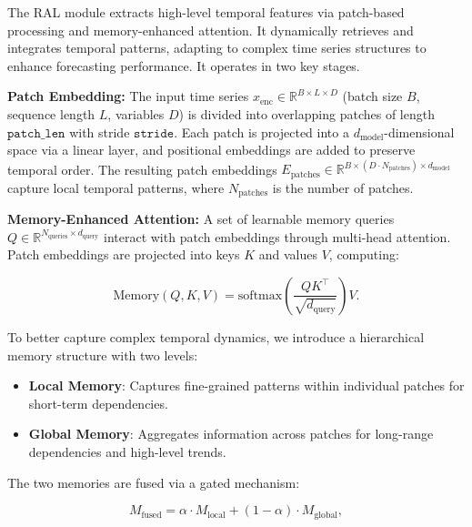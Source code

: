 The RAL module extracts high-level temporal features via patch-based processing and memory-enhanced attention. It dynamically retrieves and integrates temporal patterns, adapting to complex time series structures to enhance forecasting performance. It operates in two key stages.

\noindent\textbf{Patch Embedding:} The input time series \( x_{\text{enc}} \in \mathbb{R}^{B \times L \times D} \) (batch size \( B \), sequence length \( L \), variables \( D \)) is divided into overlapping patches of length \( \texttt{patch\_len} \) with stride \( \texttt{stride} \). Each patch is projected into a \( d_{\text{model}} \)-dimensional space via a linear layer, and positional embeddings are added to preserve temporal order. The resulting patch embeddings \( E_{\text{patches}} \in \mathbb{R}^{B \times (D \cdot N_{\text{patches}}) \times d_{\text{model}}} \) capture local temporal patterns, where \( N_{\text{patches}} \) is the number of patches.


\noindent\textbf{Memory-Enhanced Attention:} A set of learnable memory queries \( Q \in \mathbb{R}^{N_{\text{queries}} \times d_{\text{query}}} \) interact with patch embeddings through multi-head attention. Patch embeddings are projected into keys \( K \) and values \( V \), computing:

\vspace{-1em}
\begin{equation}
    \text{Memory}(Q, K, V) = \text{softmax}\left(\frac{QK^\top}{\sqrt{d_{\text{query}}}}\right)V.
\end{equation}
\vspace{-1em}

To better capture complex temporal dynamics, we introduce a hierarchical memory structure with two levels:

\vspace{-1em}
\begin{itemize}[leftmargin=*, itemsep=0pt]
    \item \textbf{Local Memory}: Captures fine-grained patterns within individual patches for short-term dependencies.
    \item \textbf{Global Memory}: Aggregates information across patches for long-range dependencies and high-level trends.
\end{itemize}
\vspace{-1em}

The two memories are fused via a gated mechanism:

\vspace{-1em}
\begin{equation}
    M_{\text{fused}} = \alpha \cdot M_{\text{local}} + (1 - \alpha) \cdot M_{\text{global}},
\end{equation}
\vspace{-1em}

